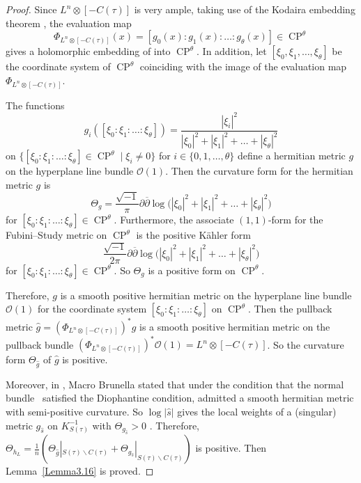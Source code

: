 \documentclass[pdftex]{sigma}
\numberwithin{equation}{section}
\begin{document}
\begin{proof}
Since $L^n \otimes [-C(\tau)]$ is very ample, taking use of the Kodaira embedding theorem \cite{Phillip}, the evaluation map
\[\Phi_{L^n \otimes [-C(\tau)]}(x)=[g_0(x):g_1(x):\dots :g_{\theta}(x)]\in \operatorname{CP}^{\theta}\]
gives a holomorphic embedding of  into $\operatorname{CP}^{\theta}$. In addition, let $[\xi_0,\xi_1,\dots ,\xi_{\theta}]$ be the coordinate system of $\operatorname{CP}^{\theta}$ coinciding with the image of the evaluation map $\Phi_{L^n \otimes [-C(\tau)]}$.

The functions
\[
g_i([\xi_0:\xi_1:\dots :\xi_{\theta}])=\frac{|\xi_i|^2}{|\xi_0|^2+|\xi_1|^2+\dots +|\xi_{\theta}|^2}
\]
on $\big \{ [\xi_0:\xi_1:\dots :\xi_{\theta}]\in \operatorname{CP}^\theta\mid \xi_i\neq 0\big \}$ for $i \in \{ 0,1,\dots ,\theta \}$ define a hermitian metric $g$ on the hyperplane line bundle $\mathcal{O}(1)$. Then the curvature form for the hermitian metric $g$ is
\[
\Theta_g=\frac{\sqrt{-1}}{\pi}\partial\overline{\partial}\log\bigl(|\xi_0|^2+|\xi_1|^2+\dots +|\xi_{\theta}|^2\bigr)
\]
for $[\xi_0:\xi_1:\dots :\xi_{\theta}]\in \operatorname{CP}^\theta$. Furthermore, the associate $(1,1)$-form for the Fubini--Study metric on $\operatorname{CP}^\theta$ is the positive K\"ahler form
\[\frac{\sqrt{-1}}{2\pi}\partial\overline{\partial}\log\bigl(|\xi_0|^2+|\xi_1|^2+\dots +|\xi_{\theta}|^2\bigr)\]
for $[\xi_0:\xi_1:\dots :\xi_{\theta}]\in \operatorname{CP}^\theta$. So $\Theta_g$ is a positive form on $\operatorname{CP}^\theta$.

Therefore, $g$ is a smooth positive hermitian metric on the hyperplane line bundle $\mathcal{O}(1)$ for the coordinate system $[\xi_0:\xi_1:\dots :\xi_{\theta}]$ on $\operatorname{CP}^{\theta}$. Then the pullback metric $\hat{g}=(\Phi_{L^n \otimes [-C(\tau)]})^*g$ is a smooth positive hermitian metric on the pullback bundle $(\Phi_{L^n \otimes [-C(\tau)]})^*\mathcal{O}(1)=L^n \otimes [-C(\tau)]$. So the curvature form $\Theta_{\hat{g}}$ of $\hat{g}$ is positive.

Moreover, in \cite{Marco}, Macro Brunella stated that under the condition that the normal bundle~ satisfied the Diophantine condition,  admitted a smooth hermitian metric with semi-positive curvature. So $\log|\hat{s}|$ gives the local weights of a (singular) metric $g_{\hat{s}}$ on $K^{-1}_{S(\tau)}$ with $\Theta_{g_{\hat{s}}}>0$ \cite[Definition~8.7]{Vincent-Ahmed}. Therefore, $\Theta_{h_L}=\frac{1}{n}(\Theta_{\hat{g}}|_{S(\tau)\backslash C(\tau)}+\Theta_{g_{\hat{s}}}|_{S(\tau)\backslash C(\tau)})$ is positive. Then Lemma~\ref{Lemma3.16} is proved. \end{proof}
\end{document}
